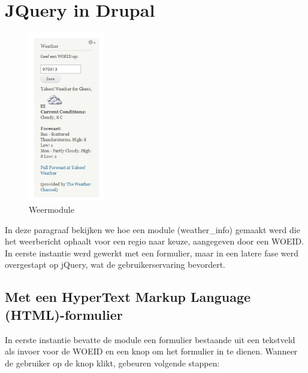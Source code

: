 \section{JQuery in Drupal} \label{jQuery}
\begin{figure}
\vspace{-40pt}
\hspace{-10pt}
\centering
\includegraphics[width=0.3\textwidth]{fig/weermodule}
\vspace{-30pt}
\hspace{-10pt}
\centering
\caption{Weermodule}
\label{fig:weermodule}
\vspace{-70pt}
\end{figure}

In deze paragraaf bekijken we hoe een module (weather\_info) gemaakt werd die het weerbericht ophaalt voor een regio naar keuze, aangegeven door een WOEID. In eerste instantie werd gewerkt met een formulier, maar in een latere fase werd overgestapt op jQuery, wat de gebruikerservaring bevordert.

\subsection{Met een HyperText Markup Language (HTML)-formulier} 
In eerste instantie bevatte de module een formulier bestaande uit een tekstveld als invoer voor de WOEID en een knop om het formulier in te dienen.
Wanneer de gebruiker op de knop klikt, gebeuren volgende stappen:


